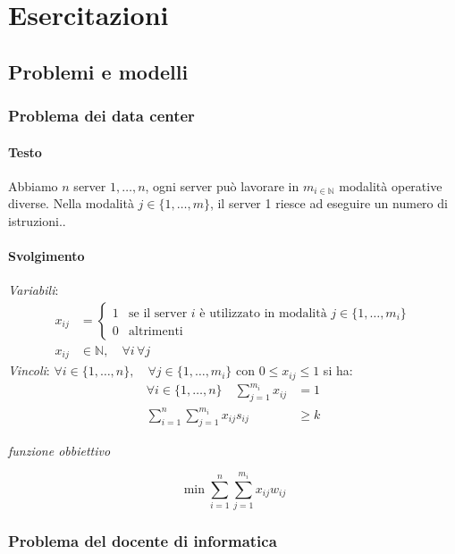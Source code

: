 % 
\chapter{Esercitazioni}

\section{Problemi e modelli}
\subsection{Problema dei data center}

\subsubsection{Testo}
Abbiamo $n$ server $1,\dots,n$, ogni server può lavorare in $m_{i\in\mathbb{N}}$ modalità operative diverse. Nella modalità $j\in\{1,\dots,m\}$, il server 1 riesce ad eseguire un numero di istruzioni..

\hspace{1.5cm}

\subsubsection{Svolgimento}

\textit{Variabili}:
\[
    \begin{aligned}
        x_{ij} &= \begin{cases}
            1 & \text{se il server $i$ è utilizzato in modalità $j\in\{1,\dots,m_i\}$} \\
            0 & \text{altrimenti}
        \end{cases}\\
        x_{ij}&\in \mathbb{N}, \quad \forall i\,\forall j
    \end{aligned}
\]
\textit{Vincoli}:
$\forall i\in \{1,\dots, n\},\quad\forall j\in\{1,\dots,m_{i}\}$ con $0\leq x_{ij}\leq 1$ si ha:
\[
    \begin{aligned}
        \forall i\in\{1,\dots,n\}\quad \sum_{j=1}^{m_i}x_{ij} &= 1\\
        \sum^n_{i=1}\sum^{m_i}_{j=1}x_{ij}s_{ij} &\geq k
    \end{aligned}
\]

\textit{funzione obbiettivo}

\[
    \min \sum^n_{i=1}\sum^{m_i}_{j=1}x_{ij}w_{ij}
\]

\subsection{Problema del docente di informatica}
